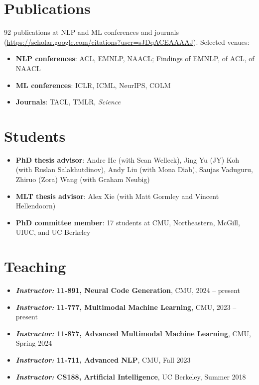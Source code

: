 \section{Publications}
92 publications at NLP and ML conferences and journals (\url{https://scholar.google.com/citations?user=sJDqACEAAAAJ}). Selected venues:
\begin{itemize}[leftmargin=-0.4mm,partopsep=0pt,label=]
  \item \textbf{NLP conferences}: ACL, EMNLP, NAACL; Findings of EMNLP, of ACL, of NAACL
  \item \textbf{ML conferences}: ICLR, ICML, NeurIPS, COLM
  \item \textbf{Journals}: TACL, TMLR, \emph{Science}
\end{itemize}
\vspace{-0.5em}

\section{Students}
\begin{itemize}[leftmargin=-0.4mm,partopsep=0pt,label=]
  \item \textbf{PhD thesis advisor}: Andre He (with Sean Welleck), Jing Yu (JY) Koh (with Ruslan Salakhutdinov), Andy Liu (with Mona Diab), Saujas Vaduguru, Zhiruo (Zora) Wang (with Graham Neubig)
  \item \textbf{MLT thesis advisor}: Alex Xie (with Matt Gormley and Vincent Hellendoorn)
  \item \textbf{PhD committee member}: 17 students at CMU, Northeastern, McGill, UIUC, and UC Berkeley
\end{itemize}
\vspace{-0.5em}

\section{Teaching}
\begin{itemize}[leftmargin=-0.4mm,partopsep=0pt,label=]
  \item \textbf{\emph{Instructor:} 11-891, Neural Code Generation}, CMU, 2024 -- present
  \item \textbf{\emph{Instructor:} 11-777, Multimodal Machine Learning}, CMU, 2023 -- present
  \item \textbf{\emph{Instructor:} 11-877, Advanced Multimodal Machine Learning}, CMU, Spring 2024
  \item \textbf{\emph{Instructor:} 11-711, Advanced NLP}, CMU, Fall 2023
  \item \textbf{\emph{Instructor:} CS188, Artificial Intelligence}, UC Berkeley, Summer 2018
\end{itemize}
\vspace{-0.5em}

